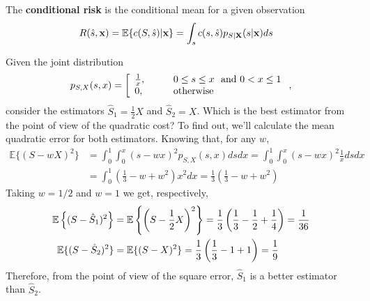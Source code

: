The {\bf conditional risk} is the conditional mean for a given observation
\begin{align}
\label{Est:cond_risk}
R(\hat s, {\bf x}) = \mathbb{E}\{c(S, \hat s) |{\bf x}\} 
           & = \int_s c(s,\hat s) p_{S|{\bf X}}(s|{\bf x}) ds
\end{align}


\begin{example}
\label{CalculoECM}
Given the joint distribution
\begin{equation}
p_{S,X}(s,x) = \left[
\begin{array}{ll}
\frac{1}{x}, & \qquad 0 \le s \le x ~~{\rm and}~ 0 < x \le 1 \\
0,           & \qquad \text{otherwise}
\end{array}
\right.,
\end{equation}
consider the estimators $\hat{S}_1 = \frac{1}{2}X$ and $\hat{S}_2 = X$. Which is the best estimator from the point of view of the quadratic cost? To find out, we'll calculate the mean quadratic error for both estimators.
Knowing that, for any $w$,
\begin{align}
\mathbb{E}\{(S-wX)^2\}   
 &= \int_0^1 \int_0^x (s-wx)^2 p_{S,X}(s,x) ds dx   
  = \int_0^1 \int_0^x (s-wx)^2 \frac{1}{x}ds dx   \nonumber\\
 &= \int_0^1 \left(\frac{1}{3} - w  + w^2 \right) x^2 dx  
  = \frac{1}{3}\left(\frac{1}{3} - w  + w^2 \right) 
\end{align}
Taking $w=1/2$ and $w=1$ we get, respectively,
\begin{align}
\mathbb{E}\left\{(S-\hat{S}_1)^2\right\} 
	&= \mathbb{E}\left\{\left(S-\frac12 X\right)^2\right\}   
     = \frac{1}{3}\left(\frac{1}{3} - \frac{1}{2}  + \frac{1}{4} \right)
     = \frac{1}{36} \\
\mathbb{E}\{(S-\hat{S}_2)^2\} & = \mathbb{E}\{(S-X)^2\}   
 = \frac{1}{3}\left(\frac{1}{3} - 1  + 1 \right) = \frac{1}{9}
\end{align}
Therefore, from the point of view of the square error, $\hat{S}_1$ is a better estimator than $\hat{S}_2$.
\end{example} \vspace{0.2cm}


